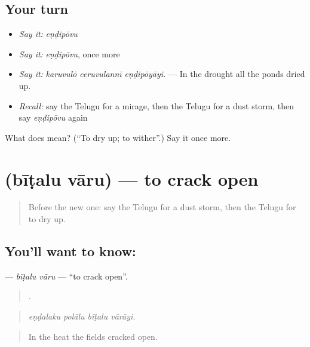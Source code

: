 \subsection*{Your turn}
\begin{itemize}
\raggedright
  \item \emph{Say it:} \emph{eṇḍipōvu}
  \item \emph{Say it:} \emph{eṇḍipōvu}, once more
  \item \emph{Say it:} \emph{karuvulō ceruvulannī eṇḍipōyāyi.} — In the drought all the ponds dried up.
  \item \emph{Recall:} say the Telugu for a mirage, then the Telugu for a dust storm, then say \emph{eṇḍipōvu} again
\end{itemize}

\begin{tcolorbox}[breakable,colback=teal!4,colframe=teal!35!black,title={Before you move on}]
What does  mean? (\textquotedblleft{}To dry up; to wither\textquotedblright{}.) Say it once more.
\end{tcolorbox}
\section[\texorpdfstring{\te{బీటలు} \te{వారు} (bīṭalu vāru)}{బీటలు వారు (bīṭalu vāru)}]{  (bīṭalu vāru) — to crack open}

\label{lesson:TE-C481-bitalu-varu}



\begin{quote}
Before the new one: say the Telugu for a dust storm, then the Telugu for to dry up.
\end{quote}

\subsection*{You'll want to know:  }
\textbf{ } — \emph{bīṭalu vāru} — \textquotedblleft{}to crack open\textquotedblright{}.

\begin{quote}
   .
\end{quote}

\begin{quote}
\emph{eṇḍalaku polālu bīṭalu vārāyi.}
\end{quote}

\begin{quote}
In the heat the fields cracked open.
\end{quote}

